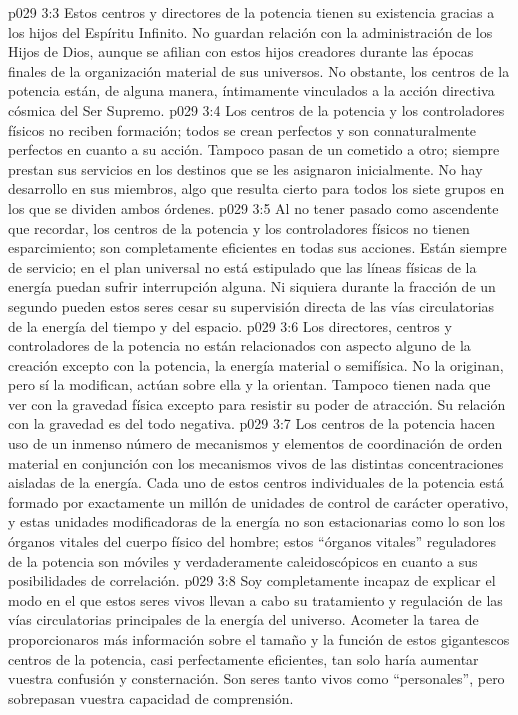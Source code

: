 \vs p029 3:3 Estos centros y directores de la potencia tienen su existencia gracias a los hijos del Espíritu Infinito. No guardan relación con la administración de los Hijos de Dios, aunque se afilian con estos hijos creadores durante las épocas finales de la organización material de sus universos. No obstante, los centros de la potencia están, de alguna manera, íntimamente vinculados a la acción directiva cósmica del Ser Supremo.
\vs p029 3:4 \pc Los centros de la potencia y los controladores físicos no reciben formación; todos se crean perfectos y son connaturalmente perfectos en cuanto a su acción. Tampoco pasan de un cometido a otro; siempre prestan sus servicios en los destinos que se les asignaron inicialmente. No hay desarrollo en sus miembros, algo que resulta cierto para todos los siete grupos en los que se dividen ambos órdenes.
\vs p029 3:5 Al no tener pasado como ascendente que recordar, los centros de la potencia y los controladores físicos no tienen esparcimiento; son completamente eficientes en todas sus acciones. Están siempre de servicio; en el plan universal no está estipulado que las líneas físicas de la energía puedan sufrir interrupción alguna. Ni siquiera durante la fracción de un segundo pueden estos seres cesar su supervisión directa de las vías circulatorias de la energía del tiempo y del espacio.
\vs p029 3:6 \pc Los directores, centros y controladores de la potencia no están relacionados con aspecto alguno de la creación excepto con la potencia, la energía material o semifísica. No la originan, pero sí la modifican, actúan sobre ella y la orientan. Tampoco tienen nada que ver con la gravedad física excepto para resistir su poder de atracción. Su relación con la gravedad es del todo negativa.
\vs p029 3:7 Los centros de la potencia hacen uso de un inmenso número de mecanismos y elementos de coordinación de orden material en conjunción con los mecanismos vivos de las distintas concentraciones aisladas de la energía. Cada uno de estos centros individuales de la potencia está formado por exactamente un millón de unidades de control de carácter operativo, y estas unidades modificadoras de la energía no son estacionarias como lo son los órganos vitales del cuerpo físico del hombre; estos “órganos vitales” reguladores de la potencia son móviles y verdaderamente caleidoscópicos en cuanto a sus posibilidades de correlación.
\vs p029 3:8 Soy completamente incapaz de explicar el modo en el que estos seres vivos llevan a cabo su tratamiento y regulación de las vías circulatorias principales de la energía del universo. Acometer la tarea de proporcionaros más información sobre el tamaño y la función de estos gigantescos centros de la potencia, casi perfectamente eficientes, tan solo haría aumentar vuestra confusión y consternación. Son seres tanto vivos como “personales”, pero sobrepasan vuestra capacidad de comprensión.
